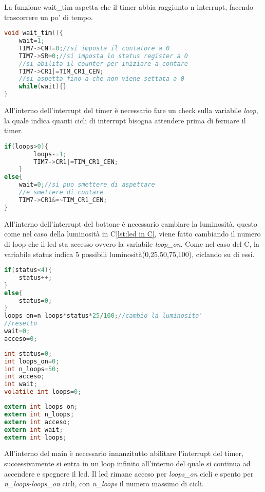 \documentclass[main.tex]{subfiles}
\begin{document}
La funzione wait\_tim aspetta che il timer abbia raggiunto n interrupt, facendo trascorrere un po' di tempo.
\begin{lstlisting}[language=C, caption=Funzione wait\_tim per aspettare]
void wait_tim(){
	wait=1;
	TIM7->CNT=0;//si imposta il contatore a 0
	TIM7->SR=0;//si imposta lo status register a 0
	//si abilita il counter per iniziare a contare
	TIM7->CR1|=TIM_CR1_CEN;
	//si aspetta fino a che non viene settata a 0
	while(wait){}
}
\end{lstlisting}
All'interno dell'interrupt del timer è necessario fare un check sulla variabile \textit{loop}, la quale indica quanti cicli di interrupt bisogna attendere prima di fermare il timer.  
\begin{lstlisting}[language=C, caption=Gestione dell'interrupt del timer]
if(loops>0){
		loops-=1;
		TIM7->CR1|=TIM_CR1_CEN;
	}
else{
	wait=0;//si puo smettere di aspettare
	//e smettere di contare
	TIM7->CR1&=~TIM_CR1_CEN;
}
\end{lstlisting}

All'interno dell'interrupt del bottone è necessario cambiare la luminosità, questo come nel caso della luminosità in C\ref{lst:led in C}, viene fatto cambiando il numero di loop che il led sta accesso ovvero la variabile \textit{loop\_on}. Come nel caso del C, la variabile status indica 5 possibili luminosità(0,25,50,75,100), ciclando su di essi.
\begin{lstlisting}[language=C, caption=Gestione interrupt del bottone]
if(status<4){
	status++;
}
else{
	status=0;
}
loops_on=n_loops*status*25/100;//cambio la luminosita'
//resetto
wait=0;
acceso=0;
\end{lstlisting}

\begin{lstlisting}[language=C, caption=Variabili globali interrupt]
int status=0;
int loops_on=0;
int n_loops=50;
int acceso;
int wait;
volatile int loops=0;
\end{lstlisting}

\begin{lstlisting}[language=C,caption=Variabili globali main]
extern int loops_on;
extern int n_loops;
extern int acceso;
extern int wait;
extern int loops;
\end{lstlisting}
All'interno del main è necessario innanzitutto abilitare l'interrupt del timer, successivamente si entra in un loop infinito all'interno del quale si continua ad accendere e spegnere il led. Il led rimane acceso per \textit{loops\_on} cicli e spento per \textit{n\_loops-loops\_on} cicli, con \textit{n\_loops} il numero massimo di cicli. 
\end{document}
